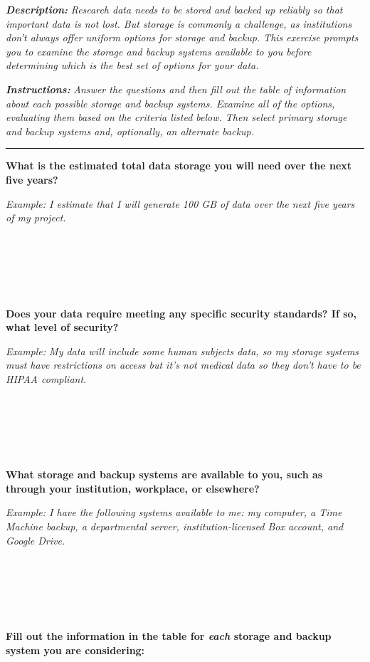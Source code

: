 \documentclass[
]{book}
\begin{document}
\textbf{\emph{Description:}} \emph{Research data needs to be stored and backed up reliably so that important data is not lost. But storage is commonly a challenge, as institutions don't always offer uniform options for storage and backup. This exercise prompts you to examine the storage and backup systems available to you before determining which is the best set of options for your data.}

\textbf{\emph{Instructions:}} \emph{Answer the questions and then fill out the table of information about each possible storage and backup systems. Examine all of the options, evaluating them based on the criteria listed below. Then select primary storage and backup systems and, optionally, an alternate backup.}

\begin{center}\rule{0.5\linewidth}{0.5pt}\end{center}

\textbf{What is the estimated total data storage you will need over the next five years?}

\emph{Example: I estimate that I will generate 100 GB of data over the next five years of my project.}

~

~

~

\textbf{Does your data require meeting any specific security standards? If so, what level of security?}

\emph{Example: My data will include some human subjects data, so my storage systems must have restrictions on access but it's not medical data so they don't have to be HIPAA compliant.}

~

~

~

\textbf{What storage and backup systems are available to you, such as through your institution, workplace, or elsewhere?}

\emph{Example: I have the following systems available to me: my computer, a Time Machine backup, a departmental server, institution-licensed Box account, and Google Drive.}

~

~

~

\textbf{Fill out the information in the table for \emph{each} storage and backup system you are considering:}
\end{document}
